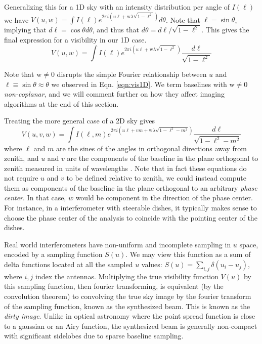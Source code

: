 Generalizing this for a 1D sky with an intensity distribution per angle of $I(\ell)$ we have $V(u,w)=\int I(\ell)e^{2\pi i (u\ell+\text{w}\lambda\sqrt{1-\ell^2})}d\theta$. Note that $\ell=\sin\theta$, implying that $d\ell=\cos\theta d\theta$, and thus that $d\theta=d\ell/\sqrt{1-\ell^2}$. This gives the final expression for a visibility in our 1D case.
\begin{equation}
V(u,w)=\int I(\ell)e^{2\pi i (u\ell+\text{w}\lambda\sqrt{1-\ell^2})}\frac{d\ell}{\sqrt{1-\ell^2}}
\end{equation}

Note that $\text{w}\neq0$ disrupts the simple Fourier relationship between $u$ and $\ell\equiv\sin\theta\approx\theta$ we observed in Eqn. \ref{eqn:vis1D}. We term baselines with $\text{w}\neq0$ \textit{non-coplanar}, and we will comment further on how they affect imaging algorithms at the end of this section.

Treating the more general case of a 2D sky gives 
\begin{equation}
V(u,v,w)=\int I(\ell,m)e^{2\pi i (u\ell+vm+\text{w}\lambda\sqrt{1-\ell^2-m^2})}\frac{d\ell}{\sqrt{1-\ell^2-m^2}}
\end{equation}
where $\ell$ and $m$ are the sines of the angles in orthogonal directions away from zenith, and $u$ and $v$ are the components of the baseline in the plane orthogonal to zenith measured in units of wavelengths \citep{thompsonmoranswenson}. Note that in fact these equations do not require $u$ and $v$ to be defined relative to zenith, we could instead compute them as components of the baseline in the plane orthogonal to an arbitrary \textit{phase center}. In that case, $w$ would be component in the direction of the phase center. For instance, in a interferometer with steerable dishes, it typically makes sense to choose the phase center of the analysis to coincide with the pointing center of the dishes. 

Real world interferometers have non-uniform and incomplete sampling in $u$ space, encoded by a sampling function $S(u)$. We may view this function as a sum of delta functions located at all the sampled $u$ values: $S(u)=\sum_{i,j}\delta(u_i-u_j)$, where $i,j$ index the antennas. Multiplying the true visibility function $V(u)$ by this sampling function, then fourier transforming, is equivalent (by the convolution theorem) to convolving the true sky image by the fourier transform of the sampling function, known as the synthesized beam. This is known as the \textit{dirty image}. Unlike in optical astronomy where the point spread function is close to a gaussian or an Airy function, the synthesized beam is generally non-compact with significant sidelobes due to sparse baseline sampling.  

